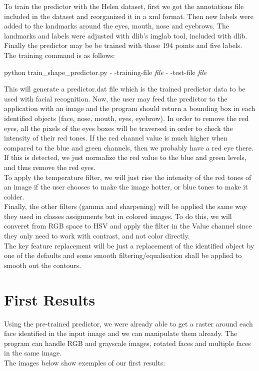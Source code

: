 \documentclass[12pt,a4paper]{article}
\begin{document}
    To train the predictor with the Helen dataset, first we got the annotations file included in the dataset and reorganized it in a xml format. Then new labels were added to the landmarks around the eyes, mouth, nose and eyebrows. The landmarks and labels were adjusted with dlib's imglab tool, included with dlib. Finally the predictor may be be trained with those 194 points and five labels. The training command is as follows:

    \begin{center}
        \large python train\_shape\_predictor.py - -training-file {\it file}  - -test-file {\it file}
    \end{center}
    
    This will generate a predictor.dat file which is the trained predictor data to be used with facial recognition.
    Now, the user may feed the predictor to the application with an image and the program should return a bounding box in each identified objects (face, nose, mouth, eyes, eyebrow). In order to remove the red eyes, all the pixels of the eyes boxes will be traversed in order to check the intensity of their red tones. If the red channel value is much higher when compared to the blue and green channels, then we probably have a red eye there. If this is detected, we just normalize the red value to the blue and green levels, and thus remove the red eyes.\\
    To apply the temperature filter, we will just rise the intensity of the red tones of an image if the user chooses to make the image hotter, or blue tones to make it colder. \\
    Finally, the other filters (gamma and sharpening) will be applied the same way they used in classes assignments but in colored images. To do this, we will converet from RGB space to HSV and apply the filter in the Value channel since they only need to work with contrast, and not color directly.\\
    The key feature replacement will be just a replacement of the identified object by one of the defaults and some smooth filtering/equalisation shall be applied to smooth out the contours.
    
    
\newpage  
\section{First Results}

    Using the pre-trained predictor, we were already able to get a raster around each face identified in the input image and we can manipulate them already. The program can handle RGB and grayscale images, rotated faces and multiple faces in the same image.\\
    The images below show exemples of our first results:
    
\end{document}
